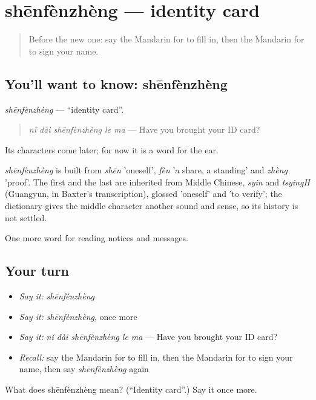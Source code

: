 \section[shēnfènzhèng]{shēnfènzhèng — identity card}

\label{lesson:ZH-C189-shenfenzheng}



\begin{quote}
Before the new one: say the Mandarin for to fill in, then the Mandarin for to sign your name.
\end{quote}

\subsection*{You'll want to know: shēnfènzhèng}
\emph{shēnfènzhèng} — \textquotedblleft{}identity card\textquotedblright{}.

\begin{quote}
\emph{nǐ dài shēnfènzhèng le ma} — Have you brought your ID card?
\end{quote}

Its characters come later; for now it is a word for the ear.

\begin{cousinweb}
\emph{shēnfènzhèng} is built from \emph{shēn} 'oneself', \emph{fèn} 'a share, a standing' and \emph{zhèng} 'proof'. The first and the last are inherited from Middle Chinese, \emph{syin} and \emph{tsyingH} (Guangyun, in Baxter's transcription), glossed 'oneself' and 'to verify'; the dictionary gives the middle character another sound and sense, so its history is not settled.
\end{cousinweb}

\begin{grammarlens}[title={What you've built}]
One more word for reading notices and messages.
\end{grammarlens}

\subsection*{Your turn}
\begin{itemize}
\raggedright
  \item \emph{Say it:} \emph{shēnfènzhèng}
  \item \emph{Say it:} \emph{shēnfènzhèng}, once more
  \item \emph{Say it:} \emph{nǐ dài shēnfènzhèng le ma} — Have you brought your ID card?
  \item \emph{Recall:} say the Mandarin for to fill in, then the Mandarin for to sign your name, then say \emph{shēnfènzhèng} again
\end{itemize}

\begin{tcolorbox}[breakable,colback=teal!4,colframe=teal!35!black,title={Before you move on}]
What does shēnfènzhèng mean? (\textquotedblleft{}Identity card\textquotedblright{}.) Say it once more.
\end{tcolorbox}
